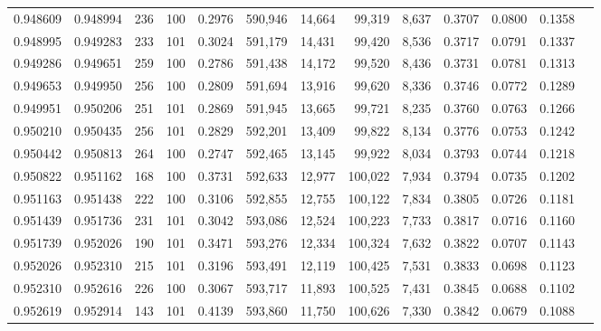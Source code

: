 \begin{tabular}{rrrrrrrrrrrrr}
0.948609 & 0.948994 &   236 & 100 &                                     0.2976 & 590,946 &  14,664 &  99,319 &   8,637 & 0.3707 & 0.0800 & 0.1358 \\
0.948995 & 0.949283 &   233 & 101 &                                     0.3024 & 591,179 &  14,431 &  99,420 &   8,536 & 0.3717 & 0.0791 & 0.1337 \\
0.949286 & 0.949651 &   259 & 100 &                                     0.2786 & 591,438 &  14,172 &  99,520 &   8,436 & 0.3731 & 0.0781 & 0.1313 \\
0.949653 & 0.949950 &   256 & 100 &                                     0.2809 & 591,694 &  13,916 &  99,620 &   8,336 & 0.3746 & 0.0772 & 0.1289 \\
0.949951 & 0.950206 &   251 & 101 &                                     0.2869 & 591,945 &  13,665 &  99,721 &   8,235 & 0.3760 & 0.0763 & 0.1266 \\
0.950210 & 0.950435 &   256 & 101 &                                     0.2829 & 592,201 &  13,409 &  99,822 &   8,134 & 0.3776 & 0.0753 & 0.1242 \\
0.950442 & 0.950813 &   264 & 100 &                                     0.2747 & 592,465 &  13,145 &  99,922 &   8,034 & 0.3793 & 0.0744 & 0.1218 \\
0.950822 & 0.951162 &   168 & 100 &                                     0.3731 & 592,633 &  12,977 & 100,022 &   7,934 & 0.3794 & 0.0735 & 0.1202 \\
0.951163 & 0.951438 &   222 & 100 &                                     0.3106 & 592,855 &  12,755 & 100,122 &   7,834 & 0.3805 & 0.0726 & 0.1181 \\
0.951439 & 0.951736 &   231 & 101 &                                     0.3042 & 593,086 &  12,524 & 100,223 &   7,733 & 0.3817 & 0.0716 & 0.1160 \\
0.951739 & 0.952026 &   190 & 101 &                                     0.3471 & 593,276 &  12,334 & 100,324 &   7,632 & 0.3822 & 0.0707 & 0.1143 \\
0.952026 & 0.952310 &   215 & 101 &                                     0.3196 & 593,491 &  12,119 & 100,425 &   7,531 & 0.3833 & 0.0698 & 0.1123 \\
0.952310 & 0.952616 &   226 & 100 &                                     0.3067 & 593,717 &  11,893 & 100,525 &   7,431 & 0.3845 & 0.0688 & 0.1102 \\
0.952619 & 0.952914 &   143 & 101 &                                     0.4139 & 593,860 &  11,750 & 100,626 &   7,330 & 0.3842 & 0.0679 & 0.1088 \\

\end{tabular}
